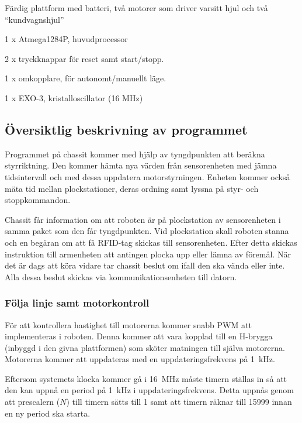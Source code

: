 \begin{packed_itemize}
\item Färdig plattform med batteri, två motorer som driver varsitt hjul och två “kundvagnshjul”
\item 1 x Atmega1284P, huvudprocessor
\item 2 x tryckknappar för reset samt start/stopp.
\item 1 x omkopplare, för autonomt/manuellt läge.
\item 1 x EXO-3, kristalloscillator (16 MHz)
\end{packed_itemize}

\subsection{Översiktlig beskrivning av programmet}

Programmet på chassit kommer med hjälp av tyngdpunkten att beräkna styrriktning. Den kommer hämta nya värden från sensorenheten med jämna tidsintervall och med dessa uppdatera motorstyrningen. Enheten kommer också mäta tid mellan plockstationer, deras ordning samt lyssna på styr- och stoppkommandon.

Chassit får information om att roboten är på plockstation av sensorenheten i samma paket som den får tyngdpunkten. Vid plockstation skall roboten stanna och en begäran om att få RFID-tag skickas till sensorenheten. Efter detta skickas instruktion till armenheten att antingen plocka upp eller lämna av föremål. När det är dags att köra vidare tar chassit beslut om ifall den ska vända eller inte. Alla dessa beslut skickas via kommunikationsenheten till datorn.



\subsubsection{Följa linje samt motorkontroll}
\label{följalinje}

För att kontrollera hastighet till motorerna kommer snabb PWM att implementeras i roboten. Denna kommer att vara kopplad till en H-brygga (inbyggd i den givna plattformen)  som sköter matningen till själva motorerna. Motorerna kommer att uppdateras med en uppdateringsfrekvens på 1~kHz.

Eftersom systemets klocka kommer gå i 16~MHz måste timern ställas in så att den kan uppnå en period på 1~kHz i uppdateringsfrekvens. Detta uppnås genom att prescalern ($N$) till timern sätts till 1 samt att timern räknar till 15999 innan en ny period ska starta. 

